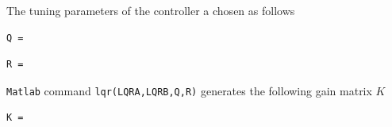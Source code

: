 The tuning parameters of the  controller a chosen as follows
\begin{lstlisting}
Q =
\end{lstlisting}
\begin{lstlisting}
R =
\end{lstlisting}
\texttt{Matlab} command \texttt{lqr(LQRA,LQRB,Q,R)} generates the following gain matrix $ K $
\begin{lstlisting}
K =
\end{lstlisting}




